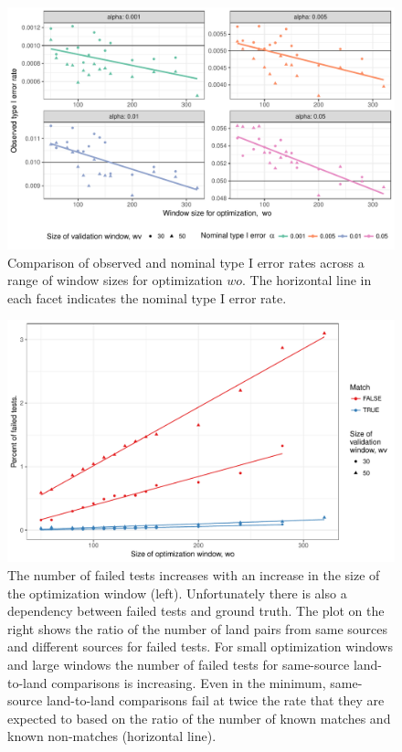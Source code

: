 \documentclass[12pt]{article}
\begin{document}
\begin{figure}

{\centering \includegraphics[width=\textwidth]{figures/type1-1} 

}

\caption{Comparison of observed and nominal type I error rates  across a range of window sizes for optimization $wo$. The horizontal line in each facet indicates the nominal type I error rate.}\label{fig:type1}
\end{figure}

\begin{figure}

{\centering \includegraphics[width=\textwidth]{figures/missings-1} 

}

\caption{The number of failed tests increases with an increase in the size of the optimization window (left). Unfortunately there is also a dependency between failed tests and ground truth. The plot on the right shows the ratio of the number of land pairs from same sources and different sources for failed tests. For small optimization windows and large windows the number of failed tests for same-source land-to-land comparisons is increasing. Even in the minimum, same-source land-to-land comparisons fail at twice the rate that they are expected to based on the ratio of the number of known matches and known non-matches (horizontal line).}\label{fig:missings}
\end{figure}
\end{document}
